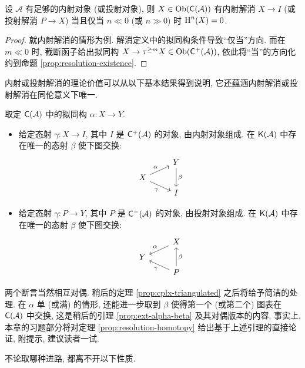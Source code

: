 \begin{corollary}
	设 $\mathcal{A}$ 有足够的内射对象 (或投射对象), 则 $X \in \operatorname{Ob}(\mathsf{C}(\mathcal{A}))$ 有内射解消 $X \to I$ (或投射解消 $P \to X$) 当且仅当 $n \ll 0$ (或 $n \gg 0$) 时 $\operatorname{H}^n(X) = 0$.
\end{corollary}
\begin{proof}
	就内射解消的情形为例. 解消定义中的拟同构条件导致``仅当''方向. 而在 $m \ll 0$ 时, 截断函子给出拟同构 $X \to \tau^{\geq m} X \in \operatorname{Ob}(\mathsf{C}^+(\mathcal{A}))$, 依此将``当''的方向化约到命题 \ref{prop:resolution-existence}.
\end{proof}

内射或投射解消的理论价值可以从以下基本结果得到说明, 它还蕴涵内射解消或投射解消在同伦意义下唯一.

\begin{theorem}\label{prop:resolution-homotopy}
	取定 $\mathsf{C}(\mathcal{A})$ 中的拟同构 $\alpha: X \to Y$.
	\begin{itemize}
		\item 给定态射 $\gamma: X \to I$, 其中 $I$ 是 $\mathsf{C}^+(\mathcal{A})$ 的对象, 由内射对象组成. 在 $\mathsf{K}(\mathcal{A})$ 中存在唯一的态射 $\beta$ 使下图交换:
		\[\begin{tikzcd}[row sep=tiny]
			& Y \arrow[dd, "\beta"] \\
			X \arrow[ru, "\alpha"] \arrow[rd, "\gamma"'] & \\
			& I
		\end{tikzcd}\]
		\item 给定态射 $\gamma: P \to Y$, 其中 $P$ 是 $\mathsf{C}^-(\mathcal{A})$ 的对象, 由投射对象组成. 在 $\mathsf{K}(\mathcal{A})$ 中存在唯一的态射 $\beta$ 使下图交换:
		\[\begin{tikzcd}[row sep=tiny]
			& X \arrow[ld, "\alpha"'] \\
			Y & \\
			& P \arrow[lu, "\gamma"] \arrow[uu, "\beta"']
		\end{tikzcd}\]
	\end{itemize}
\end{theorem}

两个断言当然相互对偶. 稍后的定理 \ref{prop:cplx-triangulated} 之后将给予简洁的处理. 在 $\alpha$ 单 (或满) 的情形, 还能进一步取到 $\beta$ 使得第一个 (或第二个) 图表在 $\mathsf{C}(\mathcal{A})$ 中交换, 这是稍后的引理 \ref{prop:ext-alpha-beta} 及其对偶版本的内容. 事实上, 本章的习题部分将对定理 \ref{prop:resolution-homotopy} 给出基于上述引理的直接论证, 附提示, 建议读者一试.

不论取哪种进路, 都离不开以下性质.


